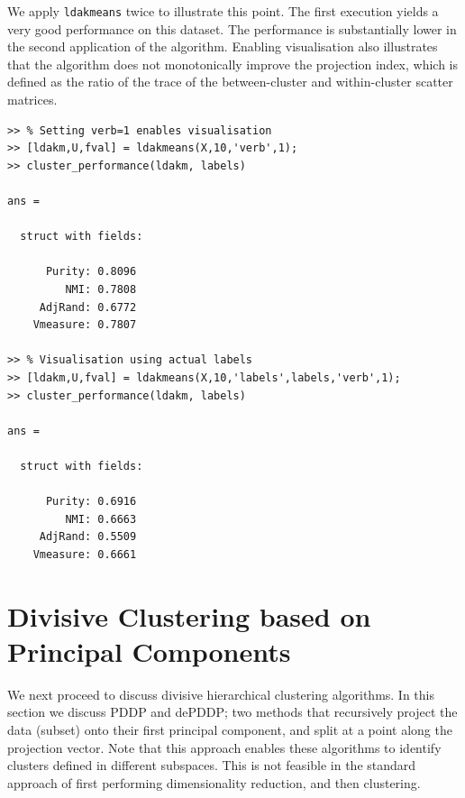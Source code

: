 \documentclass{book}
\begin{document}

We apply {\tt ldakmeans} twice to illustrate this point. The first execution yields a very good
performance on this dataset. The performance is substantially lower
in the second application of the algorithm. Enabling visualisation also
illustrates that the algorithm does not monotonically improve the
projection index, which is defined as the
ratio of the trace of the between-cluster and within-cluster scatter matrices.
%

\begin{verbatim}
>> % Setting verb=1 enables visualisation
>> [ldakm,U,fval] = ldakmeans(X,10,'verb',1);
>> cluster_performance(ldakm, labels)

ans = 

  struct with fields:

      Purity: 0.8096
         NMI: 0.7808
     AdjRand: 0.6772
    Vmeasure: 0.7807

>> % Visualisation using actual labels
>> [ldakm,U,fval] = ldakmeans(X,10,'labels',labels,'verb',1);
>> cluster_performance(ldakm, labels)

ans = 

  struct with fields:

      Purity: 0.6916
         NMI: 0.6663
     AdjRand: 0.5509
    Vmeasure: 0.6661

\end{verbatim}




\section{Divisive Clustering based on Principal Components}

We next proceed to discuss divisive hierarchical clustering algorithms.
%
In this section we discuss PDDP and dePDDP; two methods
that recursively project the data (subset) onto their first principal component, and split
at a point along the projection vector.
%
Note that this approach enables these algorithms to
identify clusters defined in different subspaces. This is not feasible in
the standard approach of first performing dimensionality
reduction, and then clustering.
\end{document}
